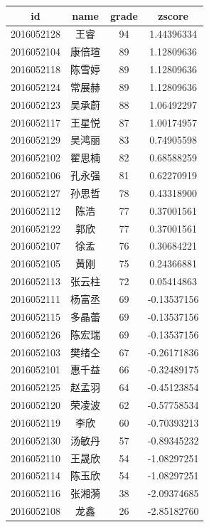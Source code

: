 \documentclass[hyperref,adobefonts]{ctexart}
\begin{document}
\begin{longtable}{c|c|c|c}
\hline
id & name & grade & zscore\\
\hline
2016052128 & 王睿 & 94 & 1.44396334\\
\hline
2016052104 & 康倍瑄 & 89 & 1.12809636\\
\hline
2016052118 & 陈雪婷 & 89 & 1.12809636\\
\hline
2016052124 & 常展赫 & 89 & 1.12809636\\
\hline
2016052123 & 吴承蔚 & 88 & 1.06492297\\
\hline
2016052117 & 王星悦 & 87 & 1.00174957\\
\hline
2016052129 & 吴鸿丽 & 83 & 0.74905598\\
\hline
2016052102 & 翟思楠 & 82 & 0.68588259\\
\hline
2016052106 & 孔永强 & 81 & 0.62270919\\
\hline
2016052127 & 孙思哲 & 78 & 0.43318900\\
\hline
2016052112 & 陈浩 & 77 & 0.37001561\\
\hline
2016052122 & 郭欣 & 77 & 0.37001561\\
\hline
2016052107 & 徐孟 & 76 & 0.30684221\\
\hline
2016052105 & 黄刚 & 75 & 0.24366881\\
\hline
2016052113 & 张云柱 & 72 & 0.05414863\\
\hline
2016052111 & 杨富丞 & 69 & -0.13537156\\
\hline
2016052115 & 多晶蕾 & 69 & -0.13537156\\
\hline
2016052126 & 陈宏瑞 & 69 & -0.13537156\\
\hline
2016052103 & 樊绪仝 & 67 & -0.26171836\\
\hline
2016052101 & 惠千益 & 66 & -0.32489175\\
\hline
2016052125 & 赵孟羽 & 64 & -0.45123854\\
\hline
2016052120 & 荣凌波 & 62 & -0.57758534\\
\hline
2016052119 & 李欣 & 60 & -0.70393213\\
\hline
2016052130 & 汤敏丹 & 57 & -0.89345232\\
\hline
2016052110 & 王晟欣 & 54 & -1.08297251\\
\hline
2016052114 & 陈玉欣 & 54 & -1.08297251\\
\hline
2016052116 & 张湘漪 & 38 & -2.09374685\\
\hline
2016052108 & 龙鑫 & 26 & -2.85182760\\
\hline
\end{longtable}
\end{document}
